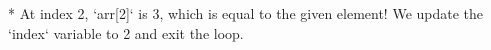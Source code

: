 \documentclass[preview]{standalone}
\begin{document}
* At index 2, `arr[2]` is 3, which is equal to the given element! We update the `index` variable to 2 and exit the loop.\\
\end{document}
